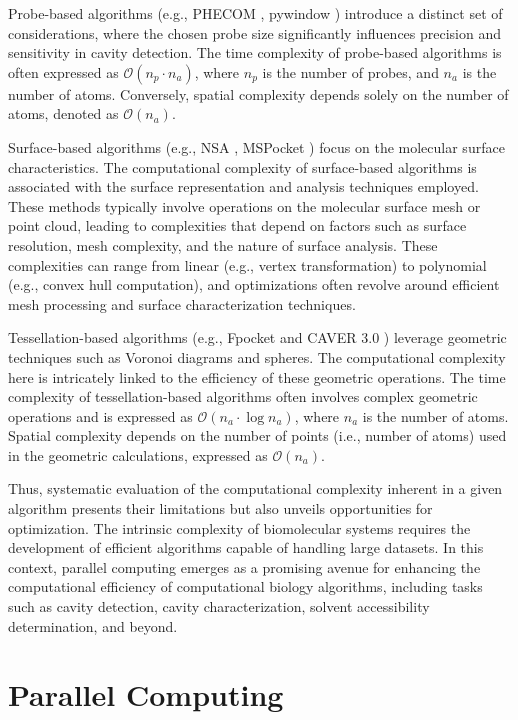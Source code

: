\documentclass[Ingles]{phdthesis}
\def\ie{i.e.\onedot}
\def\eg{e.g.\onedot}
\begin{document}
Probe-based algorithms (\eg, PHECOM \cite{phecom}, pywindow \cite{pywindow}) introduce a distinct set of considerations, where the chosen probe size significantly influences precision and sensitivity in cavity detection. The time complexity of probe-based algorithms is often expressed as $\mathcal{O}(n_{p} \cdot n_{a})$, where $n_{p}$ is the number of probes, and $n_{a}$ is the number of atoms. Conversely, spatial complexity depends solely on the number of atoms, denoted as $\mathcal{O}(n_{a})$.

Surface-based algorithms (\eg, NSA \cite{nsa}, MSPocket \cite{mspocket}) focus on the molecular surface characteristics. The computational complexity of surface-based algorithms is associated with the surface representation and analysis techniques employed. These methods typically involve operations on the molecular surface mesh or point cloud, leading to complexities that depend on factors such as surface resolution, mesh complexity, and the nature of surface analysis. These complexities can range from linear (\eg, vertex transformation) to polynomial (\eg, convex hull computation), and optimizations often revolve around efficient mesh processing and surface characterization techniques.

Tessellation-based algorithms (\eg, Fpocket \cite{fpocket} and CAVER 3.0 \cite{caver3}) leverage geometric techniques such as Voronoi diagrams and \textalpha\space spheres. The computational complexity here is intricately linked to the efficiency of these geometric operations. The time complexity of tessellation-based algorithms often involves complex geometric operations and is expressed as $\mathcal{O}(n_{a} \cdot \log{n_{a}})$, where $n_{a}$ is the number of atoms. Spatial complexity depends on the number of points (\ie, number of atoms) used in the geometric calculations, expressed as $\mathcal{O}(n_{a})$.

Thus, systematic evaluation of the computational complexity inherent in a given algorithm presents their limitations but also unveils opportunities for optimization. The intrinsic complexity of biomolecular systems requires the development of efficient algorithms capable of handling large datasets. In this context, parallel computing emerges as a promising avenue for enhancing the computational efficiency of computational biology algorithms, including tasks such as cavity detection, cavity characterization, solvent accessibility determination, and beyond.

\section{Parallel Computing \label{sec:parallel-computing}}
\end{document}
